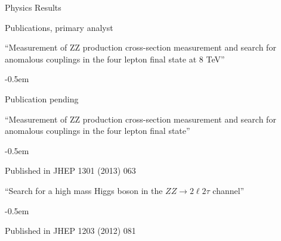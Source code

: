\documentclass{resume} %
\begin{document}
%
\begin{rSection}{Physics Results}

\begin{rSubsection}{Publications, primary analyst}{}{}{}
\item ``Measurement of ZZ production cross-section measurement and search for
anomalous couplings in the four lepton final state at 8 TeV''
    \begin{list}{}{\leftmargin=1.5em} 
      \itemsep -0.5em \vspace{-0.5em} %
      \item Publication pending
    \end{list}
\item ``Measurement of ZZ production cross-section measurement and search for
anomalous couplings in the four lepton final state''
    \begin{list}{}{\leftmargin=1.5em} 
      \itemsep -0.5em \vspace{-0.5em} %
      \item Published in JHEP 1301 (2013) 063
    \end{list}
\item ``Search for a high mass Higgs boson in the $ZZ\rightarrow2\ell2\tau$
channel''
    \begin{list}{}{\leftmargin=1.5em} 
      \itemsep -0.5em \vspace{-0.5em} %
      \item Published in JHEP 1203 (2012) 081
    \end{list}
\end{rSubsection}


\end{rSection}
\end{document}
